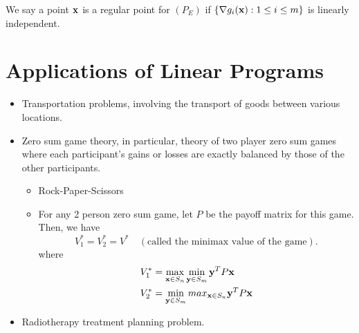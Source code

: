 We say a point \(\mathbf{x}\) is a regular point for \((P_E)\) if \(\{\nabla g_i(\mathbf{x}): 1 \leq i \leq m\}\) is linearly independent.


\section{Applications of Linear Programs}

\begin{itemize}
    \item Transportation problems, involving the transport of goods between various locations.
    \item Zero sum game theory, in particular, theory of two player zero sum games where each participant's gains or losses are exactly balanced by those of the other participants.
          \begin{itemize}
              \item Rock-Paper-Scissors
              \item \begin{theorem}
                        For any 2 person zero sum game, let \(P\) be the payoff matrix for this game. Then, we have
                        \[V_1^* = V_2^* = V^* \quad (\text{called the minimax value of the game}).\]
                        where
                        \begin{align*}
                            V_1^* & = \max_{\mathbf{x} \in S_n}\min_{\mathbf{y} \in S_m} \mathbf{y}^T P\mathbf{x} \\
                            V_2^* & = \min_{\mathbf{y} \in S_m}max_{\mathbf{x} \in S_n} \mathbf{y}^T P\mathbf{x}
                        \end{align*}
                    \end{theorem}
          \end{itemize}
    \item Radiotherapy treatment planning problem.
\end{itemize}